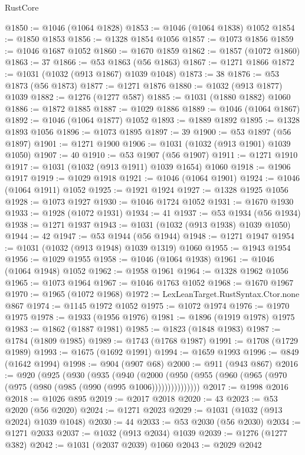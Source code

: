 \begin{lexlean}{RustCore}
\begin{coremodule}
@1850 := @1046 (@1064 @1828)
@1853 := @1046 (@1064 @1838) @1052
@1854 := @1850 @1853
@1856 := @1328 @1854 @1056
@1857 := @1073 @1856
@1859 := @1046 @1687 @1052
@1860 := @1670 @1859
@1862 := @1857 (@1072 @1860)
@1863 := 37
@1866 := @53 @1863 (@56 @1863)
@1867 := @1271 @1866
@1872 := @1031 (@1032 (@913 @1867) @1039 @1048)
@1873 := 38
@1876 := @53 @1873 (@56 @1873)
@1877 := @1271 @1876
@1880 := @1032 (@913 @1877) @1039
@1882 := @1276 (@1277 @587)
@1885 := @1031 (@1880 @1882) @1060
@1886 := @1872 @1885
@1887 := @1029 @1886
@1889 := @1046 (@1064 @1867)
@1892 := @1046 (@1064 @1877) @1052
@1893 := @1889 @1892
@1895 := @1328 @1893 @1056
@1896 := @1073 @1895
@1897 := 39
@1900 := @53 @1897 (@56 @1897)
@1901 := @1271 @1900
@1906 := @1031 (@1032 (@913 @1901) @1039 @1050)
@1907 := 40
@1910 := @53 @1907 (@56 @1907)
@1911 := @1271 @1910
@1917 := @1031 (@1032 (@913 @1911) @1039 @1654) @1060
@1918 := @1906 @1917
@1919 := @1029 @1918
@1921 := @1046 (@1064 @1901)
@1924 := @1046 (@1064 @1911) @1052
@1925 := @1921 @1924
@1927 := @1328 @1925 @1056
@1928 := @1073 @1927
@1930 := @1046 @1724 @1052
@1931 := @1670 @1930
@1933 := @1928 (@1072 @1931)
@1934 := 41
@1937 := @53 @1934 (@56 @1934)
@1938 := @1271 @1937
@1943 := @1031 (@1032 (@913 @1938) @1039 @1050)
@1944 := 42
@1947 := @53 @1944 (@56 @1944)
@1948 := @1271 @1947
@1954 := @1031 (@1032 (@913 @1948) @1039 @1319) @1060
@1955 := @1943 @1954
@1956 := @1029 @1955
@1958 := @1046 (@1064 @1938)
@1961 := @1046 (@1064 @1948) @1052
@1962 := @1958 @1961
@1964 := @1328 @1962 @1056
@1965 := @1073 @1964
@1967 := @1046 @1763 @1052
@1968 := @1670 @1967
@1970 := @1965 (@1072 @1968)
@1972 := LexLeanTarget.RustSyntax.Ctor.none @867
@1974 := @1145 @1972 @1052
@1975 := @1072 @1974
@1976 := @1970 @1975
@1978 := @1933 (@1956 @1976)
@1981 := @1896 (@1919 @1978) @1975
@1983 := @1862 (@1887 @1981)
@1985 := @1823 (@1848 @1983)
@1987 := @1784 (@1809 @1985)
@1989 := @1743 (@1768 @1987)
@1991 := @1708 (@1729 @1989)
@1993 := @1675 (@1692 @1991)
@1994 := @1659 @1993
@1996 := @849 (@1642 @1994)
@1998 := @904 (@907 @68)
@2000 := @911 (@943 @867)
@2016 := @920
    (@925
      (@930
        (@935
          (@940
            (@2000 (@950 (@955 (@960 (@965 (@970 (@975 (@980 (@985 (@990 (@995 @1006)))))))))))))))
@2017 := @1998 @2016
@2018 := @1026 @895
@2019 := @2017 @2018
@2020 := 43
@2023 := @53 @2020 (@56 @2020)
@2024 := @1271 @2023
@2029 := @1031 (@1032 (@913 @2024) @1039 @1048)
@2030 := 44
@2033 := @53 @2030 (@56 @2030)
@2034 := @1271 @2033
@2037 := @1032 (@913 @2034) @1039
@2039 := @1276 (@1277 @382)
@2042 := @1031 (@2037 @2039) @1060
@2043 := @2029 @2042

\end{coremodule}
\end{lexlean}
